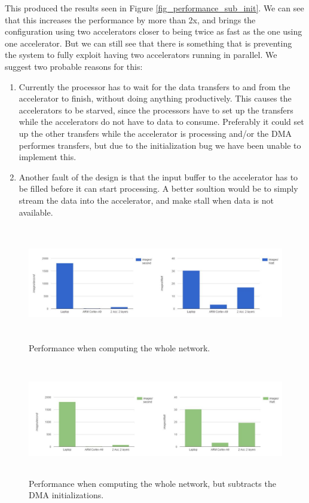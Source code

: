 This produced the results seen in Figure \ref{fig_performance_sub_init}. We can see that this increases the performance  by more than 2x, and brings the configuration using two accelerators closer to being twice as fast as the one using one accelerator. But we can still see that there is something that is preventing the system to fully exploit having two accelerators running in parallel. We suggest two probable reasons for this:

\begin{enumerate}
\item Currently the processor has to wait for the data transfers to and from the accelerator to finish, without doing anything productively. This causes the accelerators to be starved, since the processors have to set up the transfers while the accelerators do not have to data to consume. Preferably it could set up the other transfers while the accelerator is processing and/or the DMA performes transfers, but due to the initialization bug we have been unable to implement this. 
\item Another fault of the design is that the input buffer to the accelerator has to be filled before it can start processing. A better soultion would be to simply stream the data into the accelerator, and make stall when data is not available. 
\end{enumerate}


\begin{figure}[h!]
	\centering
	\includegraphics[width=1.0\textwidth,height=5cm]{Figures/Results/performance_whole_system}
	\caption{Performance when computing the whole network.}
	\label{fig_performance_whole_system}
\end{figure}

\begin{figure}[h!]
	\centering
	\includegraphics[width=1.0\textwidth,height=5cm]{Figures/Results/performance_whole_system_sub_dma_init}
	\caption{Performance when computing the whole network, but subtracts the DMA initializations.}
	\label{fig_performance_whole_system_sub_dma_init}
\end{figure}


